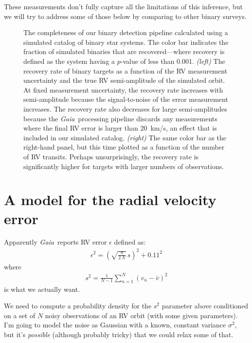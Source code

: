 \documentclass[modern, letterpaper]{aastex63}
\newcommand{\project}[1]{\textsl{#1}}
\newcommand{\Gaia}{\project{Gaia}}
\begin{document}
These measurements don't fully capture all the limitations of this inference, but we will try to address some of those below by comparing to other binary surveys.

\begin{figure}
	\caption{The completeness of our binary detection pipeline calculated using a simulated catalog of binary star systems.
		The color bar indicates the fraction of simulated binaries that are recovered---where recovery is defined as the system having a $p$-value of less than 0.001.
		\emph{(left)} The recovery rate of binary targets as a function of the RV measurement uncertainty and the true RV semi-amplitude of the simulated orbit.
		At fixed measurement uncertainty, the recovery rate increases with semi-amplitude because the signal-to-noise of the error measurement increases.
		The recovery rate also decreases for large semi-amplitudes because the \Gaia\ processing pipeline discards any measurements where the final RV error is larger than 20~km/s, an effect that is included in our simulated catalog.
		\emph{(right)} The same color bar as the right-hand panel, but this time plotted as a function of the number of RV transits.
		Perhaps unsurprisingly, the recovery rate is significantly higher for targets with larger numbers of observations.
		\label{fig:completeness}}
\end{figure}

\section{A model for the radial velocity error}

Apparently \Gaia\ reports RV error $\epsilon$ defined as:
\begin{eqnarray}
	\epsilon^2 = \left(\sqrt{\frac{\pi}{2\,N}}\,s\right)^2 + 0.11^2
\end{eqnarray}
where
\begin{eqnarray}
	s^2 = \frac{1}{N-1}\sum_{n=1}^N \left(v_n - \bar{v}\right)^2
\end{eqnarray}
is what we actually want.

We need to compute a probability density for the $s^2$ parameter above conditioned on a set of $N$ noisy observations of an RV orbit (with some given parameters).
I'm going to model the noise as Gaussian with a known, constant variance $\sigma^2$, but it's \emph{possible} (although probably tricky) that we could relax some of that.
\end{document}
